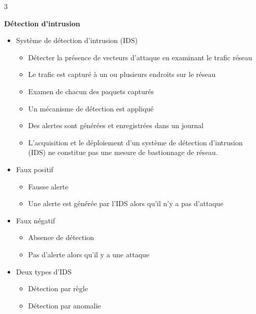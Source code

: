 \documentclass[9pt, a4paper, twoside]{article}
\begin{document}
\begin{multicols}{3}
\begin{flushleft}
    \scriptsize \textbf{Détection d'intrusion}
\end{flushleft}

\begin{itemize}[label=$\bullet$]
    \item \scriptsize Système de détection d'intrusion (IDS)
    \begin{itemize}[label=$\circ$]
        \item \scriptsize Détecter la présence de vecteurs d'attaque en examinant le trafic réseau
        \item \scriptsize Le trafic est capturé à un ou plusieurs endroits sur le réseau
        \item \scriptsize Examen de chacun des paquets capturés
        \item \scriptsize Un mécanisme de détection est appliqué
        \item \scriptsize Des alertes sont générées et enregistrées dans un journal
        \item \scriptsize L'acquisition et le déploiement d'un système de détection d'intrusion (IDS) ne constitue pas une mesure de bastionnage de réseau. 
    \end{itemize} 
    \item \scriptsize Faux positif
    \begin{itemize}[label=$\circ$]
        \item \scriptsize Fausse alerte
        \item \scriptsize Une alerte est générée par l'IDS alors qu'il n'y a pas d'attaque
    \end{itemize}
    \item \scriptsize Faux négatif
    \begin{itemize}[label=$\circ$]
        \item \scriptsize Absence de détection
        \item \scriptsize Pas d'alerte alors qu'il y a une attaque
    \end{itemize}
    \item \scriptsize Deux types d'IDS
    \begin{itemize}[label=$\circ$]
        \item \scriptsize Détection par règle
        \item \scriptsize Détection par anomalie
    \end{itemize}
\end{itemize}


\end{multicols}
\end{document}
